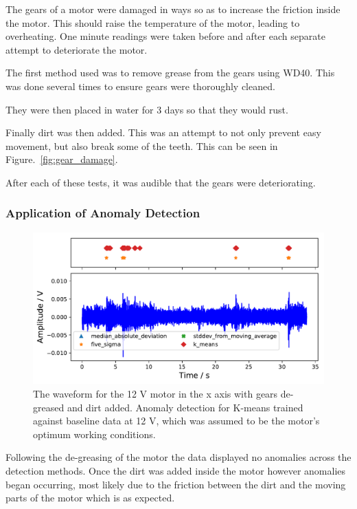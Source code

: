 The gears of a motor were damaged in ways so as to increase the friction inside the motor. This should raise the temperature of the motor, leading to overheating. One minute readings were taken before and after each separate attempt to deteriorate the motor. 

The first method used was to remove grease from the gears using WD40. This was done several times to ensure gears were thoroughly cleaned.

They were then placed in water for 3 days so that they would rust.

Finally dirt was then added. This was an attempt to not only prevent easy movement, but also break some of the teeth. This can be seen in Figure.~\ref{fig:gear_damage}.

After each of these tests, it was audible that the gears were deteriorating. 


\subsubsection{Application of Anomaly Detection}

\begin{figure}[t]
    \includegraphics[width=1.0\textwidth]{fig/WD40_dry_dirt_12V_motornorm12V.pdf}
    \caption[Anomaly Tests 12 V Motor with Dirt]{The waveform for the 12 V motor in the x axis with gears de-greased and dirt added. Anomaly detection for K-means trained against baseline data at 12 V, which was assumed to be the motor's optimum working conditions.}
    \label{fig:12V_dirt}
\end{figure}

Following the de-greasing of the motor the data displayed no anomalies across the detection methods. Once the dirt was added inside the motor however anomalies began occurring, most likely due to the friction between the dirt and the moving parts of the motor which is as expected.

